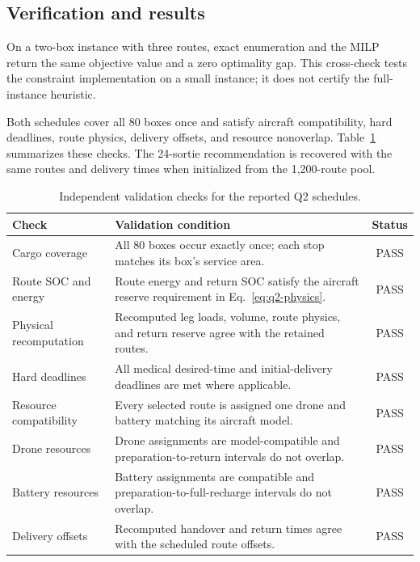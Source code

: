 \documentclass[11pt,a4paper]{article}
\begin{document}
\subsection{Verification and results}
On a two-box instance with three routes, exact enumeration and the MILP return the same objective value and a zero optimality gap. This cross-check tests the constraint implementation on a small instance; it does not certify the full-instance heuristic.

Both schedules cover all 80 boxes once and satisfy aircraft compatibility, hard deadlines, route physics, delivery offsets, and resource nonoverlap. Table~\ref{tab:q2-validation} summarizes these checks. The 24-sortie recommendation is recovered with the same routes and delivery times when initialized from the 1,200-route pool.

\begin{table}[H]
\centering
\caption{Independent validation checks for the reported Q2 schedules.}
\label{tab:q2-validation}
\begin{tabularx}{\linewidth}{@{}lXc@{}}
\toprule
Check & Validation condition & Status\\
\midrule
Cargo coverage & All 80 boxes occur exactly once; each stop matches its box's service area. & PASS\\
Route SOC and energy & Route energy and return SOC satisfy the aircraft reserve requirement in Eq.~\eqref{eq:q2-physics}. & PASS\\
Physical recomputation & Recomputed leg loads, volume, route physics, and return reserve agree with the retained routes. & PASS\\
Hard deadlines & All medical desired-time and initial-delivery deadlines are met where applicable. & PASS\\
Resource compatibility & Every selected route is assigned one drone and battery matching its aircraft model. & PASS\\
Drone resources & Drone assignments are model-compatible and preparation-to-return intervals do not overlap. & PASS\\
Battery resources & Battery assignments are compatible and preparation-to-full-recharge intervals do not overlap. & PASS\\
Delivery offsets & Recomputed handover and return times agree with the scheduled route offsets. & PASS\\
\bottomrule
\end{tabularx}
\end{table}
\end{document}
